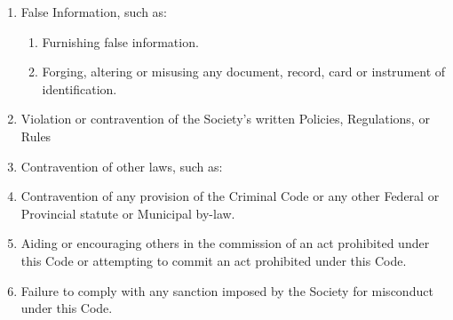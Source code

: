 \begin{enumerate} [align=left]
\begin{enumerate} [label*=\arabic*., align=left]
\item Use of the Society facilities, equipment or services contrary to express instruction or without proper authority.
\end{enumerate}
\item False Information, such as:
\begin{enumerate} [label*=\arabic*., align=left]
\item Furnishing false information.
\item Forging, altering or misusing any document, record, card or instrument of 
identification.
\end{enumerate}
\item Violation or contravention of the Society's written Policies, Regulations, or Rules
\item Contravention of other laws, such as:
\item Contravention of any provision of the Criminal Code or any other Federal or Provincial statute or Municipal by-law.
\item Aiding or encouraging others in the commission of an act prohibited under this Code or attempting to commit an act prohibited under this Code.
\item Failure to comply with any sanction imposed by the Society for misconduct under this Code.
\end{enumerate}

